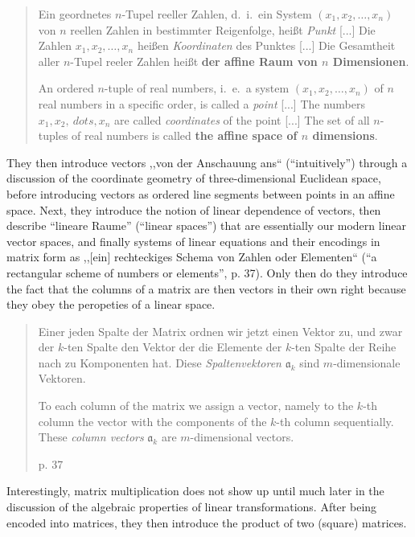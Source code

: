 \begin{quote}
    Ein geordnetes $n$-Tupel reeller Zahlen, d.\ i.\ ein System $(x_1, x_2, \dots, x_n)$
    von $n$ reellen Zahlen in bestimmter Reigenfolge, heißt \textit{Punkt} [...]
    Die Zahlen $x_1, x_2, \dots, x_n$ heißen \textit{Koordinaten} des Punktes [...]
    Die Gesamtheit aller $n$-Tupel reeler Zahlen heißt \textbf{der affine
    Raum von $n$ Dimensionen}.

    An ordered $n$-tuple of real numbers, i.\ e.\ a system $(x_1, x_2, \dots, x_n)$ of
    $n$ real numbers in a specific order, is called a \textit{point} [...]
    The numbers $ x_1, x_2, \ dots, x_n$ are called \textit{coordinates} of the point [...]
    The set of all $n$-tuples of real numbers is called \textbf{the affine
    space of $n$ dimensions}.
\end{quote}

They then introduce vectors ,,von der Anschauung ans`` (``intuitively'') through a discussion of
the coordinate geometry of three-dimensional Euclidean space, before introducing
vectors as ordered line segments between points in an affine space. Next, they
introduce the notion of linear dependence of vectors, then describe ``lineare
Raume'' (``linear spaces'') that are essentially our modern linear vector spaces,
and finally systems of linear equations and their encodings in matrix form as
,,[ein] rechteckiges Schema von Zahlen oder Elementen`` (``a rectangular scheme
of numbers or elements'', p. 37).
Only then do they introduce the fact that the columns of a matrix are then vectors
in their own right because they obey the peropeties of a linear space.

\begin{quote}
    Einer jeden Spalte der Matrix ordnen wir jetzt einen Vektor zu, und zwar der
    $k$-ten Spalte den Vektor der die Elemente der $k$-ten Spalte der Reihe nach
    zu Komponenten hat. Diese \textit{Spaltenvektoren} $\mathfrak a_k$ sind
    $m$-dimensionale Vektoren.

    To each column of the matrix we assign a vector, namely to the $k$-th column
    the vector with the components of the $k$-th column sequentially.
    These \textit{column vectors} $\mathfrak a_k$ are $m$-dimensional vectors.

    p. 37
\end{quote}


Interestingly, matrix multiplication does not show up until much later in the
discussion of the algebraic properties of linear transformations. After being
encoded into matrices, they then introduce the product of two (square) matrices.

